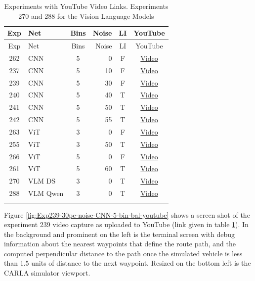\begin{longtable}{@{}clcrcc@{}}
\toprule
Exp & Net & Bins & Noise & LI & YouTube \\
\midrule
\endfirsthead
\toprule
Exp & Net & Bins & Noise & LI & YouTube \\
\midrule
\endhead
262 & CNN & 5 & 0 & F & \href{https://youtu.be/vhbmxwMlZfk}{Video} \\
237 & CNN & 5 & 10 & F & \href{https://youtu.be/3Zsny4NM_NQ}{Video} \\
239 & CNN & 5 & 30 & F & \href{https://youtu.be/CzJlbYX0CnQ}{Video} \\
240 & CNN & 5 & 40 & T & \href{https://youtu.be/FVlpiNw26J8}{Video} \\
241 & CNN & 5 & 50 & T & \href{https://youtu.be/O74AcmhYF2Y}{Video} \\
242 & CNN & 5 & 55 & T & \href{https://youtu.be/Ui-xJKEpXRs}{Video} \\
263 & ViT & 3 & 0 & F & \href{https://youtu.be/NvsoVrbx9xA}{Video} \\
255 & ViT & 3 & 50 & T & \href{https://youtu.be/e17e30eX0Rg}{Video} \\
266 & ViT & 5 & 0 & F & \href{https://youtu.be/d1YI4Eko4JE}{Video} \\
261 & ViT & 5 & 60 & T & \href{https://youtu.be/OyENq7Xe88Q}{Video} \\
270 & VLM DS & 3 & 0 & T & \href{https://youtu.be/HbAAoUBcfDw}{Video} \\
288 & VLM Qwen & 3 & 0 & T & \href{https://youtu.be/tY1LgKakAZ4}{Video} \\
\bottomrule
\caption{Experiments with YouTube Video Links. Experiments 270 and 288 for the Vision Language Models}
\label{tab:youtube_links}
\end{longtable}

Figure \ref{fig:Exp239-30pc-noise-CNN-5-bin-bal-youtube} shows a screen shot of the experiment 239 video capture as uploaded to YouTube (link given in table \ref{tab:youtube_links}). In the background and prominent on the left is the terminal screen with debug information about the nearest waypoints that define the route path, and the computed perpendicular distance to the path once the simulated vehicle is less than 1.5 units of distance to the next waypoint. Resized on the bottom left is the CARLA simulator viewport.

